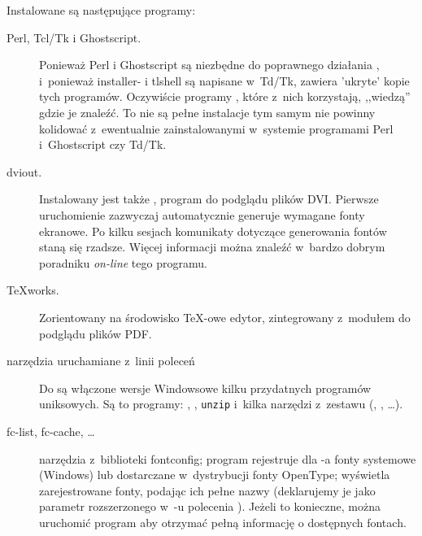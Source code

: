 \documentclass{article}
\begin{document}
Instalowane są następujące programy:
\begin{description}
\item[Perl, Tcl/Tk  i Ghostscript.] Ponieważ Perl i Ghostscript są niezbędne do
poprawnego działania \TL{}, i~ponieważ installer- i tlshell \GUI{} są napisane w~Td/Tk, \TL{} zawiera 'ukryte' kopie tych programów. Oczywiście  programy \TL{}, które
z~nich korzystają, ,,wiedzą'' gdzie je znaleźć. To nie są pełne instalacje tym samym nie powinny
kolidować z~ewentualnie zainstalowanymi w~systemie programami Perl
i~Ghostscript czy Td/Tk.
%

\item[dviout.] Instalowany jest także  , program do podglądu
plików DVI. Pierwsze uruchomienie  zazwyczaj automatycznie
generuje wymagane fonty ekranowe. Po kilku sesjach komunikaty dotyczące
generowania fontów staną się  rzadsze. Więcej informacji można znaleźć
w~bardzo dobrym poradniku \emph{on-line} tego programu.
\item[\TeX{}works.] Zorientowany na środowisko \TeX-owe edytor, zintegrowany
z~modułem do podglądu plików PDF.
\item[narzędzia uruchamiane z~linii poleceń] Do \TL{} są włączone
 wersje Windowsowe
 kilku przydatnych programów uniksowych. Są to programy: , , \texttt{unzip}  i~kilka narzędzi z~zestawu  (, , \ldots). %
\item[fc-list, fc-cache, \ldots] narzędzia z~biblioteki fontconfig; program
 rejestruje dla \XeTeX-a fonty systemowe (Windows) lub dostarczane
 w~dystrybucji \TL{} fonty OpenType;  wyświetla zarejestrowane
 fonty, podając ich pełne nazwy (deklarujemy je jako parametr rozszerzonego
 w~\XeTeX-u polecenia ). Jeżeli to konieczne, można uruchomić program  aby otrzymać pełną informację o dostępnych fontach.
\end{description}
\end{document}
